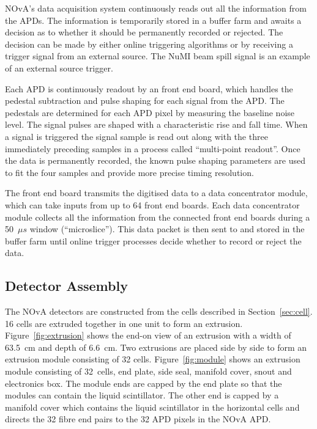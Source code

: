 NOvA's data acquisition system continuously reads out all
the information from the APDs. The information is temporarily stored
in a buffer farm and awaits a decision as to whether it should be
permanently recorded or rejected. The decision can be made by either
online triggering algorithms or by receiving a trigger signal from an
external source. The NuMI beam spill signal is an example of an
external source trigger.


Each APD is continuously readout by an front end board, which handles the pedestal
subtraction and
pulse shaping for each signal from the APD. The pedestals are
determined for each APD pixel by measuring the baseline noise level.
The signal pulses are shaped with a characteristic rise and fall
time. When a signal is triggered the signal sample is read out along
with the three immediately preceding samples in a process called
``multi-point readout''. Once the data is permanently recorded, the
known pulse shaping 
parameters are used to fit the four samples and provide more
precise timing resolution. 

The front end board transmits the digitised data to a data
concentrator module, which can take inputs from up to 64 front end
boards. 
Each data concentrator module collects all the information from the connected front end boards during a
50~$\mu s$ window (``microslice''). 
This data packet is then sent to and stored in the buffer farm
until online trigger processes decide whether to record or reject the
data. 


\subsection{Detector Assembly} \label{sec:detAssembly}

The NOvA detectors are constructed from the cells described
in Section~\ref{sec:cell}. 16 cells are extruded together in one unit
to form an extrusion.
Figure~\ref{fig:extrusion} shows the end-on view of an extrusion with
a width of 63.5~cm and depth of 6.6~cm. 
Two extrusions are placed side by side to form an extrusion module
consisting of 32 cells.
Figure~\ref{fig:module} shows an extrusion module consisting of
32~cells, end plate, side seal, manifold cover, snout and
electronics box.
The
module ends are capped by the end plate so that the modules can
contain the liquid scintillator. The other end is capped by a manifold
cover which contains the liquid scintillator in the horizontal cells
and directs the 32 fibre end pairs to the 32 APD pixels in the NOvA
APD. 


